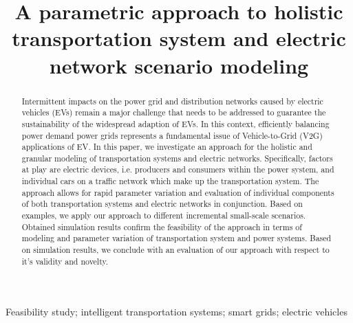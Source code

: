 \title{A parametric approach to holistic transportation system and electric network scenario modeling}

\author{
	\and
}

\maketitle

\begin{abstract}

Intermittent impacts on the power grid and distribution networks caused by electric vehicles (EVs) remain a major challenge that needs to be addressed to guarantee the sustainability of the widespread adaption of EVs. In this context, efficiently balancing power demand power grids represents a fundamental issue of Vehicle-to-Grid (V2G) applications of EV. In this paper, we investigate an approach for the holistic and granular modeling of transportation systems and electric networks. Specifically, factors at play are electric devices, i.e. producers and consumers within the power system, and individual cars on a traffic network which make up the transportation system. The approach allows for rapid parameter variation and evaluation of individual components of both transportation systems and electric networks in conjunction. Based on examples, we apply our approach to different incremental small-scale scenarios. Obtained simulation results confirm the feasibility of the approach in terms of modeling and parameter variation of transportation system and power systems. Based on simulation results, we conclude with an evaluation of our approach with respect to it's validity and novelty.

\end{abstract}

\begin{keywords}
	
Feasibility study; intelligent transportation systems; smart grids; electric vehicles 

\end{keywords}